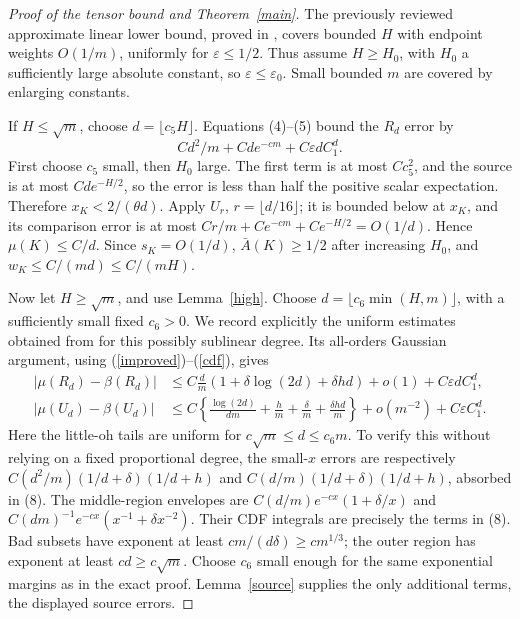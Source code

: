 \documentclass[11pt]{article}
\begin{document}
\begin{proof}[Proof of the tensor bound and Theorem~\ref{main}]
The previously reviewed approximate linear lower bound, proved in
, covers bounded $H$ with
endpoint weights $O(1/m)$, uniformly for $\varepsilon\le1/2$.
Thus assume $H\ge H_0$, with $H_0$ a sufficiently large absolute
constant, so $\varepsilon\le\varepsilon_0$. Small bounded $m$ are
covered by enlarging constants.

If $H\le\sqrt m$, choose $d=\lfloor c_5H\rfloor$. Equations
(4)--(5) bound the $R_d$ error by
\[
 C d^2/m+C d e^{-cm}+C\varepsilon d C_1^d.
\]
First choose $c_5$ small, then $H_0$ large. The first term is at most
$Cc_5^2$, and the source is at most $Cd e^{-H/2}$, so the error is
less than half the positive scalar expectation. Therefore
$x_K<2/(\theta d)$. Apply $U_r$, $r=\lfloor d/16\rfloor$;
it is bounded below at $x_K$, and its comparison error is at most
$Cr/m+Ce^{-cm}+C e^{-H/2}=O(1/d)$. Hence $\mu(K)\le C/d$.
Since $s_K=O(1/d)$, $\bar A(K)\ge1/2$ after increasing $H_0$,
and $w_K\le C/(md)\le C/(mH)$.

Now let $H\ge\sqrt m$, and use Lemma~\ref{high}. Choose
$d=\lfloor c_6\min(H,m)\rfloor$, with a sufficiently small fixed
$c_6>0$. We record explicitly the uniform estimates obtained from
 for this
possibly sublinear degree. Its all-orders Gaussian argument, using
(\ref{improved})--(\ref{cdf}), gives
\begin{align*}
 |\mu(R_d)-\beta(R_d)|
 &\le C\frac d m(1+\delta\log(2d)+\delta hd)
       +o(1)+C\varepsilon d C_1^d,\\
 |\mu(U_d)-\beta(U_d)|
 &\le C\left\{\frac{\log(2d)}{dm}+\frac hm
                   +\frac\delta m+\frac{\delta hd}m\right\}
       +o(m^{-2})+C\varepsilon C_1^d.             \tag{8}
\end{align*}
Here the little-oh tails are uniform for
$c\sqrt m\le d\le c_6m$. To verify this without relying on a
fixed proportional degree, the small-$x$ errors are respectively
$C(d^2/m)(1/d+\delta)(1/d+h)$ and
$C(d/m)(1/d+\delta)(1/d+h)$, absorbed in (8).
The middle-region envelopes are
$C(d/m)e^{-cx}(1+\delta/x)$ and
$C(dm)^{-1}e^{-cx}(x^{-1}+\delta x^{-2})$.
Their CDF integrals are precisely the terms in (8).
Bad subsets have exponent at least $cm/(d\delta)\ge c m^{1/3}$;
the outer region has exponent at least $cd\ge c\sqrt m$.
Choose $c_6$ small enough for the same exponential margins as in
the exact proof. Lemma~\ref{source} supplies the only additional
terms, the displayed source errors.


\end{proof}
\end{document}
